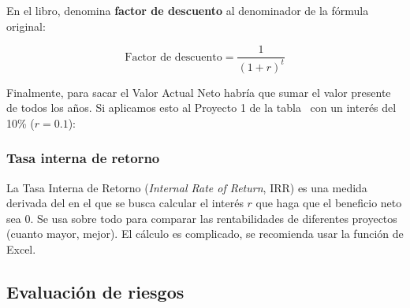 \documentclass[12pt]{article}
\begin{document}
{En el libro, denomina \textbf{factor de descuento} al denominador de la fórmula original:}

\begin{equation}
    \text{Factor de descuento} = \frac{1}{(1+r)^t}
\end{equation} \smallskip

{Finalmente, para sacar el Valor Actual Neto habría que sumar el valor presente de todos los años. Si aplicamos esto al Proyecto 1 de la tabla~ con un interés del 10\% ($r = 0.1$):}

\begin{table}[ht]
\centering
{}
\caption{Valor Actual Neto}
\label{tab:2.2}
\end{table}

\newpage
\subsubsection{Tasa interna de retorno}
\label{2.5.5}

{La Tasa Interna de Retorno (\textit{Internal Rate of Return}, IRR) es una medida derivada del  en el que se busca calcular el interés $r$ que haga que el beneficio neto sea 0. Se usa sobre todo para comparar las rentabilidades de diferentes proyectos (cuanto mayor, mejor). El cálculo es complicado, se recomienda usar la función de Excel.}

\subsection{Evaluación de riesgos}
\label{2.6.0}
\end{document}
